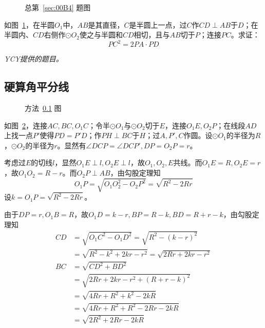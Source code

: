 

\begin{figure}[htbp]
  \centering {}
  \caption{总第~\ref{sec:00B4} 题图} \label{fig:00B4}
\end{figure}

如图~\ref{fig:00B4}，在半圆$O_1$中，$AB$是其直径，$C$是半圆上一点，过$C$作$CD \perp AB$于$D$；在半圆内、$CD$右侧作$\odot O_2$使之与半圆和$CD$相切，且与$AB$切于$P$；连接$PC$。求证：
\[ PC^2 = 2PA\cdot PD \]

\emph{YCY提供的题目。}

\subsection{硬算角平分线} \label{subsec:00B4-bis}

\begin{figure}[htbp]
  \centering {}
  \caption{方法~\ref{subsec:00B4-bis} 图} \label{fig:00B4-bis}
\end{figure}

如图~\ref{fig:00B4-bis}，连接$AC, BC, O_1C$；令半$\odot O_1$与$\odot O_2$切于$E$，连接$O_1E, O_2P$；在线段$AD$上找一点$P'$使得$PD = P'D$；作$PH \perp BC$于$H$；过$A, P', C$作圆。设$\odot O_1$的半径为$R$，$\odot O_2$的半径为$r$。显然有$\angle DCP = \angle DCP', DP = O_2P = r$。

考虑过$E$的切线$l$，显然$O_1E \perp l, O_2E \perp l$，故$O_1, O_2, E$共线。而$O_1E = R, O_2E = r$，故$O_1O_2 = R - r$。而$O_2P \perp AB$，由勾股定理知
\[ O_1P = \sqrt{O_1O_2^2 - O_2P^2} = \sqrt{R^2 - 2Rr} \]
设$k = O_1P = \sqrt{R^2 - 2Rr}$。

由于$DP = r, O_1B = R$，故$O_1D = k - r, BP = R - k, BD = R + r - k$，由勾股定理知
\begin{align*}
  CD &= \sqrt{O_1C^2 - O_1D^2} = \sqrt{R^2 - (k - r)^2} \\
  &= \sqrt{R^2 - k^2 + 2kr - r^2} = \sqrt{2Rr + 2kr - r^2} \\
  BC &= \sqrt{CD^2 + BD^2} \\
  &= \sqrt{2Rr + 2kr - r^2 + (R + r - k)^2} \\
  &= \sqrt{4Rr + R^2 + k^2 - 2kR} \\
  &= \sqrt{4Rr + R^2 + R^2 - 2Rr - 2kR} \\
  &= \sqrt{2R^2 + 2Rr - 2kR}
\end{align*}

